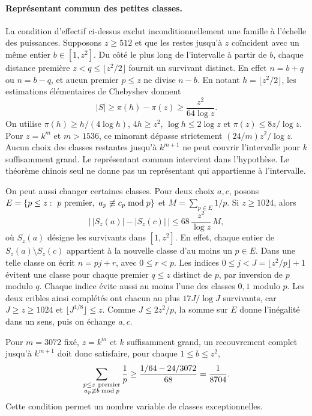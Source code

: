 \documentclass[11pt,a4paper]{article}
\begin{document}
\paragraph{Représentant commun des petites classes.}
La condition d'effectif ci-dessus exclut inconditionnellement une
famille à l'échelle des puissances. Supposons $z\ge512$ et que les
restes jusqu'à $z$ coïncident avec un même entier $b\in[1,z^2]$.
Du côté le plus long de l'intervalle à partir de $b$, chaque distance
première $z<q\le\lfloor z^2/2\rfloor$ fournit un survivant distinct.
En effet $n=b+q$ ou $n=b-q$, et aucun premier $p\le z$ ne divise
$n-b$. En notant $h=\lfloor z^2/2\rfloor$, les estimations
élémentaires de Chebyshev donnent
\[
 |S|\ge\pi(h)-\pi(z)\ge\frac{z^2}{64\log z}.
\]
On utilise $\pi(h)\ge h/(4\log h)$, $4h\ge z^2$,
$\log h\le2\log z$ et $\pi(z)\le8z/\log z$.
Pour $z=k^m$ et $m>1536$, ce minorant dépasse strictement
$(24/m)z^2/\log z$. Aucun choix des classes restantes jusqu'à
$k^{m+1}$ ne peut couvrir l'intervalle pour $k$ suffisamment grand.
Le représentant commun intervient dans l'hypothèse. Le théorème chinois
seul ne donne pas un représentant qui appartienne à l'intervalle.

On peut aussi changer certaines classes. Pour deux choix $a,c$, posons
$E=\{p\le z:\ p\ {\rm premier},\ a_p\not\equiv c_p\bmod p\}$
et $M=\sum_{p\in E}1/p$. Si $z\ge1024$, alors
\[
 \bigl|\,|S_z(a)|-|S_z(c)|\,\bigr|
 \le 68\,\frac{z^2}{\log z}\,M ,
\]
où $S_z(a)$ désigne les survivants dans $[1,z^2]$.
En effet, chaque entier de $S_z(a)\setminus S_z(c)$ appartient à la
nouvelle classe d'au moins un $p\in E$. Dans une telle classe on écrit
$n=pj+r$, avec $0\le r<p$. Les indices $0\le j<J=\lfloor z^2/p\rfloor+1$
évitent une classe pour chaque premier $q\le z$ distinct de $p$, par
inversion de $p$ modulo $q$. Chaque indice évite aussi au moins l'une
des classes $0,1$ modulo $p$. Les deux cribles ainsi complétés ont
chacun au plus $17J/\log J$ survivants, car $J\ge z\ge1024$ et
$\lfloor J^{1/8}\rfloor\le z$. Comme $J\le2z^2/p$, la somme sur $E$
donne l'inégalité dans un sens, puis on échange $a,c$.

Pour $m=3072$ fixé, $z=k^m$ et $k$ suffisamment grand, un recouvrement
complet jusqu'à $k^{m+1}$ doit donc satisfaire, pour chaque $1\le b\le z^2$,
\[
 \sum_{\substack{p\le z\ {\rm premier}\\a_p\not\equiv b\bmod p}}\frac1p
 \ge \frac{1/64-24/3072}{68}=\frac1{8704}.
\]
Cette condition permet un nombre variable de classes exceptionnelles.
\end{document}
